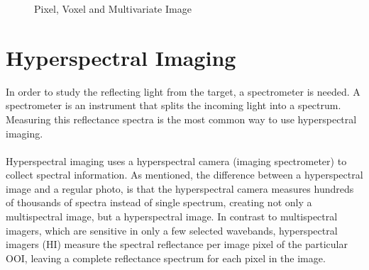 \begin{figure}[H]
  \begin{minipage}{\wd\FigBox}
    \centering\usebox{\FigBox}
  \end{minipage}\hspace*{\FigHSkip}
  \caption{Pixel, Voxel and Multivariate Image}
  \label{fig:pogv}
\end{figure}

\vspace{1.3cm}
\section{Hyperspectral Imaging}
In order to study the reflecting light from the target, a spectrometer is needed. A spectrometer is an instrument that splits the incoming light into a spectrum. Measuring this reflectance spectra is the most common way to use hyperspectral imaging.
\\\\
Hyperspectral imaging uses a hyperspectral camera (imaging spectrometer) to collect spectral information. As mentioned, the difference between a hyperspectral image and a regular photo, is that the hyperspectral camera measures hundreds of thousands of spectra instead of single spectrum, creating not only a multispectral image, but a hyperspectral image. In contrast to multispectral imagers, which are sensitive in only a few selected wavebands, hyperspectral imagers (HI) measure the spectral reflectance per image pixel of the particular OOI, leaving a complete reflectance spectrum for each pixel in the image. %

